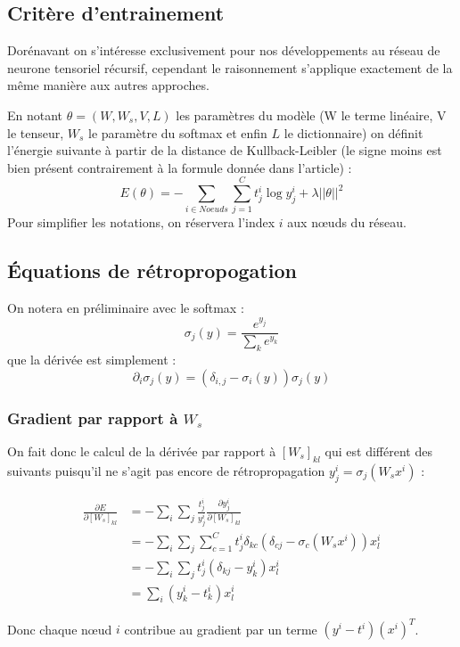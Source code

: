 \documentclass[conference]{IEEEtran}
\begin{document}
\subsection{Critère d'entrainement}
Dorénavant on s'intéresse exclusivement pour nos développements au réseau de neurone tensoriel récursif, cependant le raisonnement s'applique exactement de la même manière aux autres approches.

En notant $\theta=(W,W_s,V,L)$ les paramètres du modèle (W le terme linéaire, V le tenseur, $W_s$ le paramètre du softmax et enfin $L$ le dictionnaire) on définit l'énergie suivante à partir de la distance de Kullback-Leibler (le signe moins est bien présent contrairement à la formule donnée dans l'article) :
$$E(\theta)=-\sum_{i\in Noeuds}\sum_{j=1}^C t^i_j\log y^i_j+\lambda ||\theta||^2$$
Pour simplifier les notations, on réservera l'index $i$ aux nœuds du réseau.

\subsection{Équations de rétropropogation}
On notera en préliminaire avec le softmax :
$$\sigma_j(y)=\frac{e^{y_j}}{\sum_ k e^{y_k}}$$
que la dérivée est simplement :
$$\partial_i\sigma_j(y)=(\delta_{i,j}-\sigma_i(y))\sigma_j(y)$$

\subsubsection{Gradient par rapport à $W_s$}
On fait donc le calcul de la dérivée par rapport à $[W_s]_{kl}$ qui est différent des suivants puisqu'il ne s'agit pas encore de rétropropagation $y^i_j=\sigma_j(W_s x^i)$ :

\begin{align*}
\frac{\partial E}{\partial [W_s]_{kl}}&=-\sum_{i}\sum_j \frac{t_j^i}{y_j^i} \frac{\partial y_j^i}{\partial [W_s]_{kl}}\\
&=-\sum_i\sum_j \sum_{c=1}^C t_j^i\delta_{kc}(\delta_{cj}-\sigma_c(W_s x^i))x^i_l\\
&=-\sum_i\sum_j t_j^i (\delta_{kj}-y_k^i)x_l^i\\
&= \sum_i (y_k^i -t_k^i) x_l^i
\end{align*}

Donc chaque nœud $i$ contribue au gradient par un terme $(y^i-t^i)(x^i)^T$.
\end{document}
